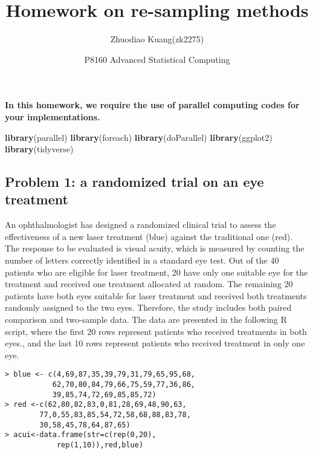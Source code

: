 \documentclass[
]{article}
\title{Homework on re-sampling methods}
\author{Zhuodiao Kuang(zk2275)}
\date{P8160 Advanced Statistical Computing}
\newenvironment{Shaded}{\begin{snugshade}}{\end{snugshade}}
\newcommand{\FunctionTok}[1]{\textcolor[rgb]{0.13,0.29,0.53}{\textbf{#1}}}
\newcommand{\NormalTok}[1]{#1}
\begin{document}
\maketitle

\textbf{In this homework, we require the use of parallel computing codes
for your implementations.}

\begin{Shaded}
\begin{Highlighting}[]
\FunctionTok{library}\NormalTok{(parallel)}
\FunctionTok{library}\NormalTok{(foreach)}
\FunctionTok{library}\NormalTok{(doParallel)}
\FunctionTok{library}\NormalTok{(ggplot2)}
\FunctionTok{library}\NormalTok{(tidyverse)}
\end{Highlighting}
\end{Shaded}

\hypertarget{problem-1-a-randomized-trial-on-an-eye-treatment}{%
\subsection{Problem 1: a randomized trial on an eye
treatment}\label{problem-1-a-randomized-trial-on-an-eye-treatment}}

An ophthalmologist has designed a randomized clinical trial to assess
the effectiveness of a new laser treatment (blue) against the
traditional one (red). The response to be evaluated is visual acuity,
which is measured by counting the number of letters correctly identified
in a standard eye test. Out of the 40 patients who are eligible for
laser treatment, 20 have only one suitable eye for the treatment and
received one treatment allocated at random. The remaining 20 patients
have both eyes suitable for laser treatment and received both treatments
randomly assigned to the two eyes. Therefore, the study includes both
paired comparison and two-sample data. The data are presented in the
following R script, where the first 20 rows represent patients who
received treatments in both eyes., and the last 10 rows represent
patients who received treatment in only one eye.

\begin{verbatim}
> blue <- c(4,69,87,35,39,79,31,79,65,95,68,
           62,70,80,84,79,66,75,59,77,36,86,
           39,85,74,72,69,85,85,72)
> red <-c(62,80,82,83,0,81,28,69,48,90,63,
        77,0,55,83,85,54,72,58,68,88,83,78,
        30,58,45,78,64,87,65)
> acui<-data.frame(str=c(rep(0,20),
            rep(1,10)),red,blue)
\end{verbatim}
\end{document}
